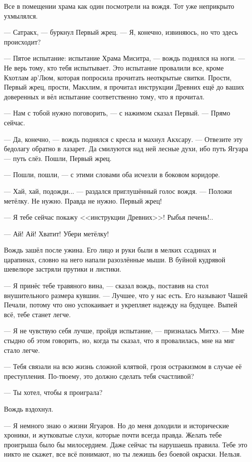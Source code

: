 Все в помещении храма как один посмотрели на вождя.
Тот уже неприкрыто ухмылялся.

--- Сатракх, --- буркнул Первый жрец.
--- Я, конечно, извиняюсь, но что здесь происходит?

--- Пятое испытание: испытание Храма Миситра, --- вождь поднялся на ноги.
--- Не верь тому, кто тебя испытывает.
Это испытание провалили все, кроме Кхотлам ар'Люм, которая попросила прочитать неоткрытые свитки.
Прости, Первый жрец, прости, Макхлим, я прочитал инструкции Древних ещё до ваших доверенных и вёл испытание соответственно тому, что я прочитал.

--- Нам с тобой нужно поговорить, --- с нажимом сказал Первый.
--- Прямо сейчас.

--- Да, конечно, --- вождь поднялся с кресла и махнул Акхсару.
--- Отвезите эту бедолагу обратно в лазарет.
Да смилуются над ней лесные духи, ибо путь Ягуара --- путь слёз.
Пошли, Первый жрец.

--- Пошли, пошли, --- с этими словами оба исчезли в боковом коридоре.

--- Хай, хай, подожди... --- раздался приглушённый голос вождя.
--- Положи метёлку.
Не нужно.
Правда не нужно.
Первый жрец!

--- Я тебе сейчас покажу <<инструкции Древних>>!
Рыбья печень!..

--- Ай!
Ай!
Хватит!
Убери метёлку!

\textspace

Вождь зашёл после ужина.
Его лицо и руки были в мелких ссадинах и царапинах, словно на него напали разозлённые мыши.
В буйной кудрявой шевелюре застряли прутики и листики.

--- Я принёс тебе травяного вина, --- сказал вождь, поставив на стол внушительного размера кувшин.
--- Лучшее, что у нас есть.
Его называют Чашей Печали, потому что оно успокаивает и укрепляет надежду на будущее.
Выпей всё, тебе станет легче.

--- Я не чувствую себя лучше, пройдя испытание, --- призналась Митхэ.
--- Мне стыдно об этом говорить, но, когда ты сказал, что я провалилась, мне на миг стало легче.

--- Тебя связали на всю жизнь сложной клятвой, грозя остракизмом в случае её преступления.
По-твоему, это должно сделать тебя счастливой?

--- Ты хотел, чтобы я проиграла?

Вождь вздохнул.

--- Я немного знаю о жизни Ягуаров.
Но до меня доходили и исторические хроники, и жутковатые слухи, которые почти всегда правда.
Желать тебе проигрыша было бы милосердием.
Даже сейчас ты нарушаешь правила.
Тебе это никто не скажет, все всё понимают, но ты лежишь без боевой окраски.
Нельзя.

